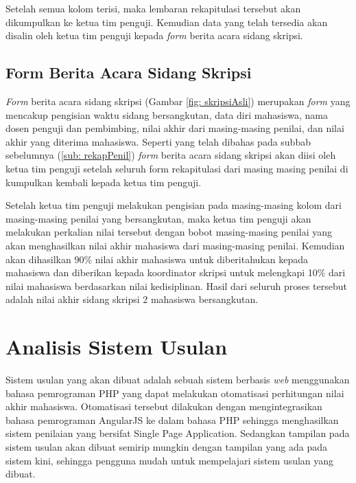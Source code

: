 	Setelah semua kolom terisi, maka lembaran rekapitulasi tersebut akan dikumpulkan ke ketua tim penguji. Kemudian data yang telah tersedia akan disalin oleh ketua tim penguji kepada \textit{form} berita acara sidang skripsi.
	
	\subsection{Form Berita Acara Sidang Skripsi}
	\label{sub: formSkripsi}
	
	\textit{Form} berita acara sidang skripsi (Gambar \ref{fig: skripsiAsli}) merupakan \textit{form} yang mencakup pengisian waktu sidang bersangkutan, data diri mahasiswa, nama dosen penguji dan pembimbing, nilai akhir dari masing-masing penilai, dan nilai akhir yang diterima mahasiswa. Seperti yang telah dibahas pada subbab sebelumnya (\ref{sub: rekapPenil}) \textit{form} berita acara sidang skripsi akan diisi oleh ketua tim penguji setelah seluruh form rekapitulasi dari masing masing penilai di kumpulkan kembali kepada ketua tim penguji.
	
	Setelah ketua tim penguji melakukan pengisian pada masing-masing kolom dari masing-masing penilai yang bersangkutan, maka ketua tim penguji akan melakukan perkalian nilai tersebut dengan bobot masing-masing penilai yang akan menghasilkan nilai akhir mahasiswa dari masing-masing penilai. Kemudian akan dihasilkan 90\% nilai akhir mahasiswa untuk diberitahukan kepada mahasiswa dan diberikan kepada koordinator skripsi untuk melengkapi 10\% dari nilai mahasiswa berdasarkan nilai kedisiplinan. Hasil dari seluruh proses tersebut adalah nilai akhir sidang skripsi 2 mahasiswa bersangkutan.
	
\section{Analisis Sistem Usulan}
\label{sec: analisisSUsulan}

Sistem usulan yang akan dibuat adalah sebuah sistem berbasis \textit{web} menggunakan bahasa pemrograman PHP yang dapat melakukan otomatisasi perhitungan nilai akhir mahasiswa. Otomatisasi tersebut dilakukan dengan mengintegrasikan bahasa pemrograman AngularJS ke dalam bahasa PHP sehingga menghasilkan sistem penilaian yang bersifat Single Page Application. Sedangkan tampilan pada sistem usulan akan dibuat semirip mungkin dengan tampilan yang ada pada sistem kini, sehingga pengguna mudah untuk mempelajari sistem usulan yang dibuat.


